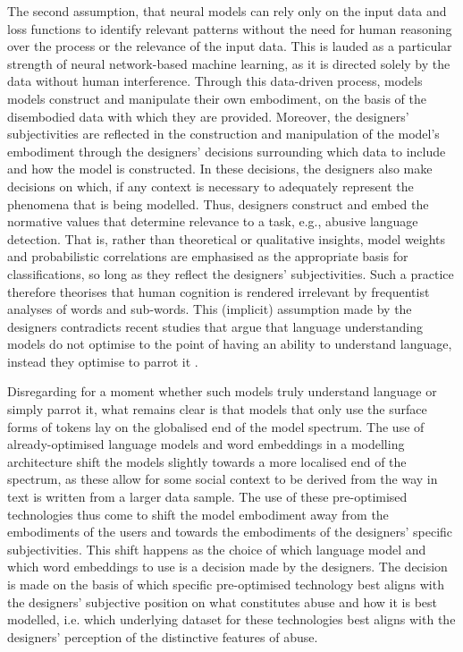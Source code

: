 {The second assumption, that neural models can rely only on the input data and loss functions to identify relevant patterns without the need for human reasoning over the process or the relevance of the input data.
This is lauded as a particular strength of neural network-based machine learning, as it is directed solely by the data without human interference.
Through this data-driven process, models models construct and manipulate their own embodiment, on the basis of the disembodied data with which they are provided.
Moreover, the designers' subjectivities are reflected in the construction and manipulation of the model's embodiment through the designers' decisions surrounding which data to include and how the model is constructed.
In these decisions, the designers also make decisions on which, if any context is necessary to adequately represent the phenomena that is being modelled.
Thus, designers construct and embed the normative values that determine relevance to a task, e.g., abusive language detection.
That is, rather than theoretical or qualitative insights, model weights and probabilistic correlations are emphasised as the appropriate basis for classifications, so long as they reflect the designers' subjectivities.
Such a practice therefore theorises that human cognition is rendered irrelevant by frequentist analyses of words and sub-words.
This (implicit) assumption made by the designers contradicts recent studies that argue that language understanding models do not optimise to the point of having an ability to understand language, instead they optimise to parrot it \citep{Bender-Koller:2020}.

Disregarding for a moment whether such models truly understand language or simply parrot it, what remains clear is that models that only use the surface forms of tokens lay on the globalised end of the model spectrum.
The use of already-optimised language models and word embeddings in a modelling architecture shift the models slightly towards a more localised end of the spectrum, as these allow for some social context to be derived from the way in text is written from a larger data sample.
The use of these pre-optimised technologies thus come to shift the model embodiment away from the embodiments of the users and towards the embodiments of the designers' specific subjectivities.
This shift happens as the choice of which language model and which word embeddings to use is a decision made by the designers.
The decision is made on the basis of which specific pre-optimised technology best aligns with the designers' subjective position on what constitutes abuse and how it is best modelled, i.e. which underlying dataset for these technologies best aligns with the designers' perception of the distinctive features of abuse.

}

